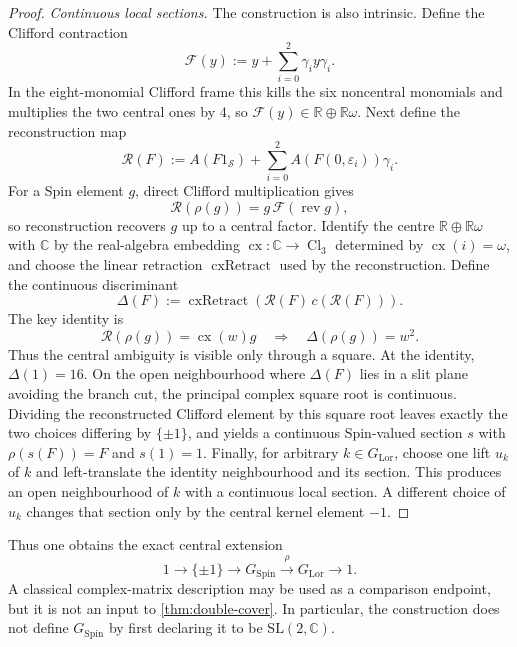 \documentclass[11pt,a4paper]{article}
\theoremstyle{definition}
\theoremstyle{remark}
\newcommand{\R}{\mathbb{R}}
\newcommand{\Smodel}{\mathcal{S}}
\newcommand{\Cl}{\operatorname{Cl}}
\newcommand{\SpinG}{G_{\mathrm{Spin}}}
\newcommand{\LorG}{G_{\mathrm{Lor}}}
\begin{document}
\begin{proof}
\emph{Continuous local sections.}  The construction is also intrinsic.  Define the Clifford contraction
\[
   \mathcal F(y)
   :=y+\sum_{i=0}^{2}\gamma_i y\gamma_i .
\]
In the eight-monomial Clifford frame this kills the six noncentral
monomials and multiplies the two central ones by \(4\), so
\(\mathcal F(y)\in\R\oplus\R\omega\).  Next define the reconstruction map
\[
   \mathcal R(F)
   :=A(F1_{\Smodel})
     +\sum_{i=0}^{2}A\!\left(F(0,\varepsilon_i)\right)\gamma_i .
\]
For a Spin element \(g\), direct Clifford multiplication gives
\[
   \mathcal R(\rho(g))
   =g\,\mathcal F(\operatorname{rev}g),
\]
so reconstruction recovers \(g\) up to a central factor.  Identify the
centre \(\R\oplus\R\omega\) with \(\mathbb C\) by the real-algebra embedding
\(\operatorname{cx}:\mathbb C\to\Cl_3\) determined by
\(\operatorname{cx}(i)=\omega\), and choose the linear retraction
\(\operatorname{cxRetract}\) used by the reconstruction.  Define the
continuous discriminant
\[
   \Delta(F)
   :=\operatorname{cxRetract}\!\left(
      \mathcal R(F)\,c(\mathcal R(F))
   \right).
\]
The key identity is
\[
   \mathcal R(\rho(g))=\operatorname{cx}(w)g
   \quad\Longrightarrow\quad
   \Delta(\rho(g))=w^2.
\]
Thus the central ambiguity is visible only through a square.  At the identity,
\(\Delta(1)=16\).  On the open neighbourhood where \(\Delta(F)\) lies in
a slit plane avoiding the branch cut, the principal complex square root is
continuous.  Dividing the reconstructed Clifford element by this square root
leaves exactly the two choices differing by \(\{\pm1\}\), and yields a
continuous Spin-valued section \(s\) with \(\rho(s(F))=F\) and \(s(1)=1\).
Finally, for arbitrary \(k\in\LorG\), choose one lift \(u_k\) of \(k\) and
left-translate the identity neighbourhood and its section.  This produces
an open neighbourhood of \(k\) with a continuous local section.  A
different choice of \(u_k\) changes that section only by the central
kernel element \(-1\).
\end{proof}

Thus one obtains the exact central extension
\[
   1\longrightarrow\{\pm1\}
   \longrightarrow\SpinG
   \overset{\rho}{\longrightarrow}\LorG
   \longrightarrow1.
\tag{3.11}
\]
A classical complex-matrix description may be used as a comparison
endpoint, but it is not an input to \cref{thm:double-cover}.  In particular,
the construction does not define \(\SpinG\) by first declaring it to be
\(\mathrm{SL}(2,\mathbb C)\).

\clearpage
\end{document}
